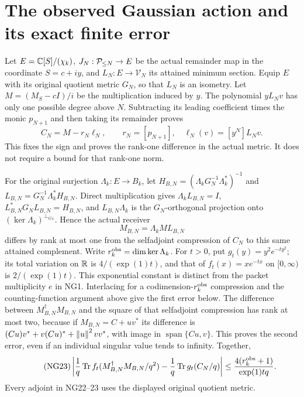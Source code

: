 \section{The observed Gaussian action and its exact finite error}
Let $E=\mathbb C[S]/(\chi_k)$, $J_N:\mathcal P_{\le N}\to E$ be the actual
remainder map in the coordinate $S=c+iy$, and $L_N:E\to\mathcal V_N$
its attained minimum section. Equip $E$ with its original quotient
metric $G_N$, so that $L_N$ is an isometry. Let
$M=(M_S-cI)/i$ be the multiplication induced by $y$.
The polynomial $yL_Nv$ has only one possible degree above $N$.
Subtracting its leading coefficient times the monic $p_{N+1}$ and
then taking its remainder proves
\begin{equation}\tag{NG21}
 C_N=M-r_N\ell_N,\qquad
 r_N=[p_{N+1}],\quad \ell_N(v)=[y^N]L_Nv.
\end{equation}
This fixes the sign and proves the rank-one difference in the actual
metric. It does not require a bound for that rank-one norm.

For the original surjection $\Lambda_k:E\to B_k$, let
$H_{B,N}=(\Lambda_kG_N^{-1}\Lambda_k^*)^{-1}$ and
$L_{B,N}=G_N^{-1}\Lambda_k^*H_{B,N}$. Direct multiplication gives
$\Lambda_kL_{B,N}=I$, $L_{B,N}^*G_NL_{B,N}=H_{B,N}$, and
$L_{B,N}\Lambda_k$ is the $G_N$-orthogonal projection onto
$(\ker\Lambda_k)^{\perp_{G_N}}$. Hence the actual receiver
\begin{equation}\tag{NG22}
 M_{B,N}=\Lambda_kML_{B,N}
\end{equation}
differs by rank at most one from the selfadjoint compression of $C_N$
to this same attained complement. Write $r_k^{\rm obs}=\dim\ker\Lambda_k$.
For $t>0$, put $g_t(y)=y^2e^{-ty^2}$; its total variation on $\mathbb R$ is
$4/(\exp(1)t)$, and that of $f_t(x)=xe^{-tx}$ on $[0,\infty)$ is
$2/(\exp(1)t)$. This exponential constant is distinct from the packet
multiplicity $e$ in NG1.
Interlacing for a codimension-$r_k^{\rm obs}$ compression and the
counting-function argument above give the first error below.
The difference between $M_{B,N}^{\dagger}M_{B,N}$ and the square of
that selfadjoint compression has rank at most two, because if
$M_{B,N}=C+uv^*$ its difference is
$(Cu)v^*+v(Cu)^*+\left\lVert u\right\rVert^2vv^*$, with image in
$\operatorname{span}\{Cu,v\}$. This proves the second error, even if
an individual singular value tends to infinity. Together,
\begin{equation}\tag{NG23}
 \left|\frac1q\operatorname{Tr} f_t(M_{B,N}^{\dagger}M_{B,N}/q^2)
             -\frac1q\operatorname{Tr} g_t(C_N/q)\right|
 \le\frac{4(r_k^{\rm obs}+1)}{\exp(1)tq}.
\end{equation}
Every adjoint in NG22--23 uses the displayed original quotient metric.

